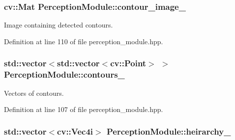 \subsubsection[{\texorpdfstring{contour\+\_\+image\+\_\+}{contour_image_}}]{\setlength{\rightskip}{0pt plus 5cm}cv\+::\+Mat Perception\+Module\+::contour\+\_\+image\+\_\+\hspace{0.3cm}{\ttfamily [private]}}\hypertarget{class_perception_module_a4c6044231fa94975cf299e5cd60ba447}{}\label{class_perception_module_a4c6044231fa94975cf299e5cd60ba447}


Image containing detected contours. 



Definition at line 110 of file perception\+\_\+module.\+hpp.

\subsubsection[{\texorpdfstring{contours\+\_\+}{contours_}}]{\setlength{\rightskip}{0pt plus 5cm}std\+::vector$<$std\+::vector$<$cv\+::\+Point$>$ $>$ Perception\+Module\+::contours\+\_\+\hspace{0.3cm}{\ttfamily [private]}}\hypertarget{class_perception_module_ae611b010af7c0351eb889165198ee82a}{}\label{class_perception_module_ae611b010af7c0351eb889165198ee82a}


Vectors of contours. 



Definition at line 107 of file perception\+\_\+module.\+hpp.

\subsubsection[{\texorpdfstring{heirarchy\+\_\+}{heirarchy_}}]{\setlength{\rightskip}{0pt plus 5cm}std\+::vector$<$cv\+::\+Vec4i$>$ Perception\+Module\+::heirarchy\+\_\+\hspace{0.3cm}{\ttfamily [private]}}\hypertarget{class_perception_module_a1ed5ed9b4c99dd984e76c30f25754282}{}\label{class_perception_module_a1ed5ed9b4c99dd984e76c30f25754282}


